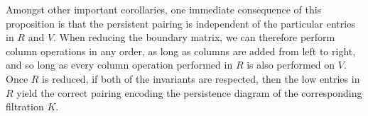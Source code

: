 \documentclass{siamart190516}
\begin{document}
\noindent
Amongst other important corollaries, one immediate consequence of this proposition is that the persistent pairing is independent of the particular entries in $R$ and $V$. When reducing the boundary matrix, we can therefore perform column operations in any order, as long as columns are added from left to right, and so long as every column operation performed in $R$ is also performed on $V$. Once $R$ is reduced, if both of the invariants are respected, then the low entries in $R$ yield the correct pairing encoding the persistence diagram of the corresponding filtration $K$.
\end{document}
